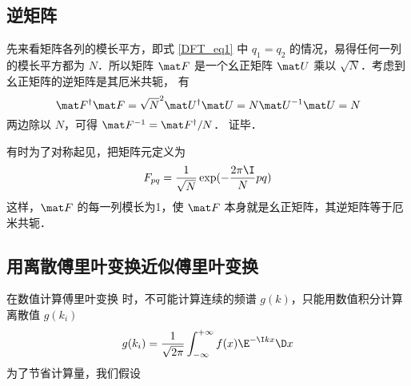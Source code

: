 \subsection{逆矩阵}
先来看矩阵各列的模长平方，即式 \eqref{DFT_eq1} 中 $q_1=q_2$ 的情况，易得任何一列的模长平方都为 $N$．所以矩阵 $\mat F$ 是一个幺正矩阵 $\mat U$ 乘以 $\sqrt{N}$．考虑到幺正矩阵的逆矩阵是其厄米共轭， %
有
\begin{equation}
\mat F^\dag \mat F = \sqrt{N}^2 \mat U^\dag \mat U = N \mat U^{-1} \mat U = N
\end{equation}
两边除以 $N$，可得 $\mat F^{-1} = \mat F^\dag /N$． 证毕．

有时为了对称起见，把矩阵元定义为
\begin{equation}
F_{pq} = \frac{1}{\sqrt{N}}\exp(-\frac{2\pi\I}{N} p q)
\end{equation}
这样，$\mat F$ 的每一列模长为1，使 $\mat F$ 本身就是幺正矩阵，其逆矩阵等于厄米共轭．

\subsection{用离散傅里叶变换近似傅里叶变换}
在数值计算傅里叶变换 %
时，不可能计算连续的频谱 $g(k)$，只能用数值积分计算离散值 $g(k_i)$
\begin{equation}
g(k_i) = \frac{1}{\sqrt{2\pi}} \int_{-\infty}^{+\infty} f(x)\E^{-\I kx} \D x
\end{equation}
为了节省计算量，我们假设

